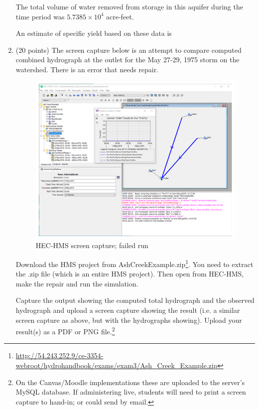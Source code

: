 \documentclass[12pt]{article}
\begin{document}
\begin{enumerate}
The total volume of water removed from storage in this aquifer during the time period
was $5.7385 \times 10^4$ acre-feet.

An estimate of specific yield based on these data is

\clearpage
\item (20 points) The screen capture below is an attempt to compare computed combined hydrograph at the outlet for the May 27-29, 1975 storm on the watershed.   There is an error that needs repair.

\begin{figure}[h!] %
   \centering
   \includegraphics[width=6in]{HMS-Broke.png} 
   \caption{HEC-HMS screen capture; failed run}
   \label{fig:HMSBroke}
\end{figure}

Download the HMS project from AshCreekExample.zip\footnote{\url{http://54.243.252.9/ce-3354-webroot/hydrohandbook/exams/exam3/Ash_Creek_Example.zip}}.  You need to extract the .zip file (which is an entire HMS project).  Then open from HEC-HMS, make the repair and run the simulation.

Capture the output showing the computed total hydrograph and the observed hydrograph and upload a screen capture showing the result (i.e. a similar screen capture as above, but with the hydrographs showing).  Upload your result(s) as a PDF or PNG file.\footnote{On the Canvas/Moodle implementations these are uploaded to the server's MySQL database.  If administering live, students will need to print a screen capture to hand-in; or could send by email.}

\end{enumerate}
\end{document}
